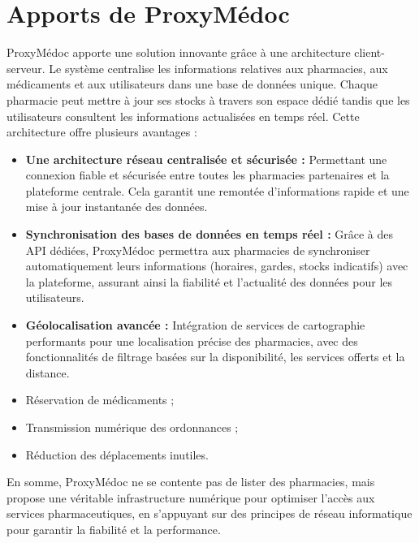 \documentclass[12pt,a4paper]{report}
\begin{document}
	\section{Apports de ProxyMédoc} %
	ProxyMédoc apporte une solution innovante grâce à une architecture client-serveur. %
	Le système centralise les informations relatives aux pharmacies, aux médicaments et aux utilisateurs dans une base de données unique. %
	Chaque pharmacie peut mettre à jour ses stocks à travers son espace dédié tandis que les utilisateurs consultent les informations actualisées en temps réel. %
	Cette architecture offre plusieurs avantages : %
	\begin{itemize} %
		\item \textbf{Une architecture réseau centralisée et sécurisée :} Permettant une connexion fiable et sécurisée entre toutes les pharmacies partenaires et la plateforme centrale. %
		Cela garantit une remontée d'informations rapide et une mise à jour instantanée des données. %
		\item \textbf{Synchronisation des bases de données en temps réel :} Grâce à des API dédiées, ProxyMédoc permettra aux pharmacies de synchroniser automatiquement leurs informations (horaires, gardes, stocks indicatifs) avec la plateforme, assurant ainsi la fiabilité et l'actualité des données pour les utilisateurs. %
		\item \textbf{Géolocalisation avancée :} Intégration de services de cartographie performants pour une localisation précise des pharmacies, avec des fonctionnalités de filtrage basées sur la disponibilité, les services offerts et la distance. %
		\item Réservation de médicaments ; %
		\item Transmission numérique des ordonnances ; %
		\item Réduction des déplacements inutiles. %
	\end{itemize} %
	
	En somme, ProxyMédoc ne se contente pas de lister des pharmacies, mais propose une véritable infrastructure numérique pour optimiser l'accès aux services pharmaceutiques, en s'appuyant sur des principes de réseau informatique pour garantir la fiabilité et la performance. %
	
\end{document}
